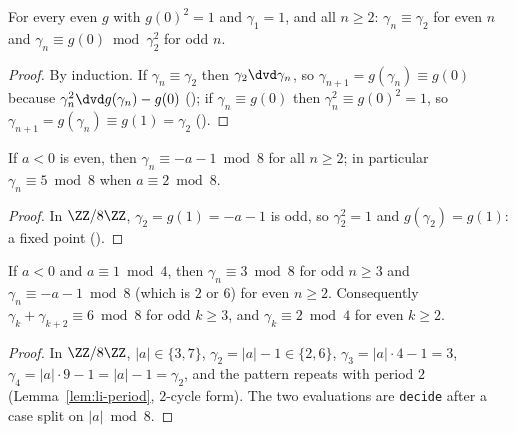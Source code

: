 \begin{lemma}
  \label{lem:li-modsq}
  \leanok
  For every even $g$ with $g(0)^2 = 1$ and $\gamma_1 = 1$, and all $n \ge 2$:
  $\gamma_n \equiv \gamma_2$ for even $n$ and $\gamma_n \equiv g(0) \bmod \gamma_2^2$ for odd $n$.
\end{lemma}
\begin{proof}
  \leanok
  By induction. If $\gamma_n \equiv \gamma_2$ then $\gamma_2 \dvd \gamma_n$, so
  $\gamma_{n+1} = g(\gamma_n) \equiv g(0)$ because $\gamma_n^2 \dvd g(\gamma_n) - g(0)$
  (); if $\gamma_n \equiv g(0)$ then
  $\gamma_n^2 \equiv g(0)^2 = 1$, so $\gamma_{n+1} = g(\gamma_n) \equiv g(1) = \gamma_2$
  ().
\end{proof}

\begin{lemma}[$a$ even]
  \label{lem:li-mod8-2}
  \leanok
  If $a < 0$ is even, then $\gamma_n \equiv -a - 1 \bmod 8$ for all $n \ge 2$; in particular
  $\gamma_n \equiv 5 \bmod 8$ when $a \equiv 2 \bmod 8$.
\end{lemma}
\begin{proof}
  \leanok
  In $\ZZ/8\ZZ$, $\gamma_2 = g(1) = -a - 1$ is odd, so $\gamma_2^2 = 1$ and $g(\gamma_2) = g(1)$:
  a fixed point ().
\end{proof}

\begin{lemma}
  \label{lem:li-mod8-1}
  \leanok
  If $a < 0$ and $a \equiv 1 \bmod 4$, then $\gamma_n \equiv 3 \bmod 8$ for odd $n \ge 3$ and
  $\gamma_n \equiv -a - 1 \bmod 8$ (which is $2$ or $6$) for even $n \ge 2$. Consequently
  $\gamma_k + \gamma_{k+2} \equiv 6 \bmod 8$ for odd $k \ge 3$, and $\gamma_k \equiv 2 \bmod 4$ for
  even $k \ge 2$.
\end{lemma}
\begin{proof}
  \leanok
  In $\ZZ/8\ZZ$, $|a| \in \{3, 7\}$, $\gamma_2 = |a| - 1 \in \{2, 6\}$, $\gamma_3 = |a| \cdot 4 - 1
  = 3$, $\gamma_4 = |a| \cdot 9 - 1 = |a| - 1 = \gamma_2$, and the pattern repeats with period $2$
  (Lemma~\ref{lem:li-period}, $2$-cycle form). The two evaluations are \texttt{decide} after a
  case split on $|a| \bmod 8$.
\end{proof}

